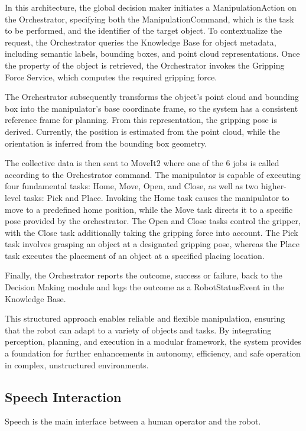 In this architecture, the global decision maker initiates a ManipulationAction on the Orchestrator, specifying both the ManipulationCommand, which is the task to be performed, and the identifier of the target object. To contextualize the request, the Orchestrator queries the Knowledge Base for object metadata, including semantic labels, bounding boxes, and point cloud representations. Once the property of the object is retrieved, the Orchestrator invokes the Gripping Force Service, which computes the required gripping force.

The Orchestrator subsequently transforms the object's point cloud and bounding box into the manipulator's base coordinate frame, so the system has a consistent reference frame for planning. From this representation, the gripping pose is derived. Currently, the position is estimated from the point cloud, while the orientation is inferred from the bounding box geometry.

The collective data is then sent to MoveIt2 where one of the 6 jobs is called according to the Orchestrator command. The manipulator is capable of executing four fundamental tasks: Home, Move, Open, and Close, as well as two higher-level tasks: Pick and Place. Invoking the Home task causes the manipulator to move to a predefined home position, while the Move task directs it to a specific pose provided by the orchestrator. The Open and Close tasks control the gripper, with the Close task additionally taking the gripping force into account. The Pick task involves grasping an object at a designated gripping pose, whereas the Place task executes the placement of an object at a specified placing location.

Finally, the Orchestrator reports the outcome, success or failure, back to the Decision Making module and logs the outcome as a RobotStatusEvent in the Knowledge Base.

This structured approach enables reliable and flexible manipulation, ensuring that the robot can adapt to a variety of objects and tasks. By integrating perception, planning, and execution in a modular framework, the system provides a foundation for further enhancements in autonomy, efficiency, and safe operation in complex, unstructured environments.

\subsection{Speech Interaction}

Speech is the main interface between a human operator and the robot.

